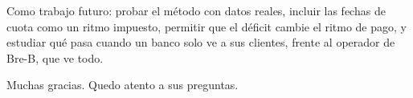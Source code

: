 \begin{decir}
Como trabajo futuro: probar el método con datos reales, incluir las fechas de cuota como
un ritmo impuesto, permitir que el déficit cambie el ritmo de pago, y estudiar qué pasa
cuando un banco solo ve a sus clientes, frente al operador de Bre-B, que ve todo.
\end{decir}

\begin{decir}
Muchas gracias. Quedo atento a sus preguntas.
\end{decir}
